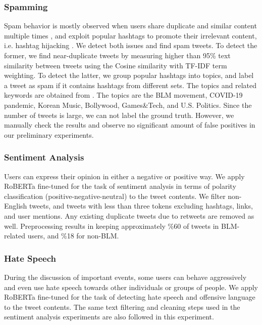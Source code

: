 \documentclass[sigconf]{acmart}
\begin{document}
\subsubsection{Spamming} 
Spam behavior is mostly observed when users share duplicate and similar content multiple times \cite{Hinesley:2019}, and exploit popular hashtags to promote their irrelevant content, i.e. hashtag hijacking \cite{VanDam:2016}. We detect both issues and find spam tweets. To detect the former, we find near-duplicate tweets by measuring higher than 95\% text similarity between tweets using the Cosine similarity with TF-IDF term weighting. To detect the latter, we group popular hashtags into topics, and label a tweet as spam if it contains hashtags from different sets. The topics and related keywords are obtained from \cite{Sahinuc:2021}. The topics are the BLM movement, COVID-19 pandemic, Korean Music, Bollywood, Games\&Tech, and U.S. Politics. Since the number of tweets is large, we can not label the ground truth. However, we manually check the results and observe no significant amount of false positives in our preliminary experiments.

\subsubsection{Sentiment Analysis}
Users can express their opinion in either a negative or positive way. We apply RoBERTa \cite{Liu:2019} fine-tuned for the task of sentiment analysis in terms of polarity classification (positive-negative-neutral) \cite{Barbieri:2020} to the tweet contents.
We filter non-English tweets, and tweets with less than three tokens excluding hashtags, links, and user mentions. Any existing duplicate tweets due to retweets are removed as well. Preprocessing results in keeping approximately \%60 of tweets in BLM-related users, and \%18 for non-BLM. 
    
\subsubsection{Hate Speech}
During the discussion of important events, some users can behave aggressively and even use hate speech towards other individuals or groups of people. We apply RoBERTa \cite{Liu:2019} fine-tuned for the task of detecting hate speech and offensive language \cite{Mathew:2020} to the tweet contents. The same text filtering and cleaning steps used in the sentiment analysis experiments are also followed in this experiment.
    
\end{document}
